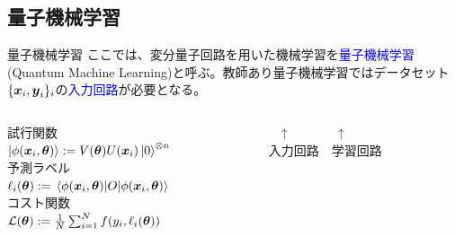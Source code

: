 \documentclass[dvipdfmx,10pt,aspectratio=169]{beamer}
\begin{document}
\subsection{量子機械学習}
\begin{frame}{量子機械学習}
    ここでは、変分量子回路を用いた機械学習を\textcolor{blue}{量子機械学習}(Quantum Machine Learning)と呼ぶ。教師あり量子機械学習ではデータセット$\{\vb*{x}_i,\vb*{y}_i\}_i$の\textcolor{blue}{入力回路}が必要となる。
    
    \begin{center}
        {\large\colorbox{blue!40}{}}
    \end{center}
    \begin{columns}
        \begin{column}{0.5\textwidth}
            \centering
            試行関数\\
            $\ket{\phi(\vb*{x}_i,\vb*{\theta})} := V(\vb*{\theta})U(\vb*{x}_i)\ket{0}^{\otimes n}$\\
            \vspace*{10pt}
            予測ラベル\\
            $\ell_{i}(\vb*{\theta}) := \expval{O}{\phi(\vb*{x}_i,\vb*{\theta})}$\\
            \vspace*{10pt}
            コスト関数\\
            $\mathcal{L}(\vb*{\theta}) := \frac1N\sum_{i=1}^N f(y_i,\ell_{i}(\vb*{\theta}))$
        \end{column}

        \begin{column}{0.5\textwidth}
            \begin{center}
            \end{center}
            \vspace*{-30pt}
            \hspace*{55pt} 　↑　　　　↑\\
            \hspace*{55pt}  入力回路　学習回路\\
        \end{column}
    \end{columns}
\end{frame}
\end{document}
